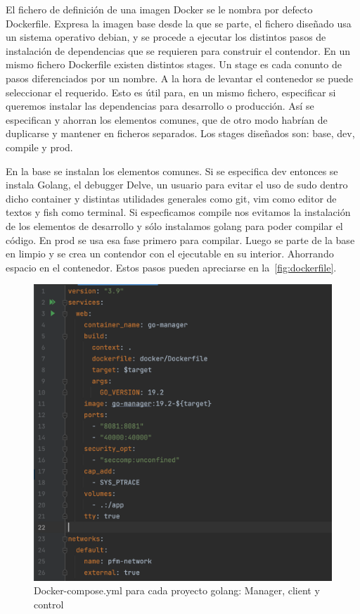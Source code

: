 
El fichero de definición de una imagen Docker se le nombra por defecto Dockerfile. Expresa la imagen base desde la que se parte, el fichero diseñado usa un sistema operativo debian, y se procede a ejecutar los distintos pasos de instalación de dependencias que se requieren para construir el contendor. En un mismo fichero Dockerfile existen distintos stages. Un stage es cada conunto de pasos diferenciados por un nombre. A la hora de levantar el contenedor se puede seleccionar el requerido. Esto es útil para, en un mismo fichero, especificar si queremos instalar las dependencias para desarrollo o producción. Así se especifican y ahorran los elementos comunes, que de otro modo habrían de duplicarse y mantener en ficheros separados. Los stages diseñados son: base, dev, compile y prod.

En la base se instalan los elementos comunes. Si se especifica dev entonces se instala Golang, el debugger Delve, un usuario para evitar el uso de sudo dentro dicho container y distintas utilidades generales como git, vim como editor de textos y fish como terminal. Si especficamos compile nos evitamos la instalación de los elementos de desarrollo y sólo instalamos golang para poder compilar el código. En prod se usa esa fase primero para compilar. Luego se parte de la base en limpio y se crea un contendor con el ejecutable en su interior. Ahorrando espacio en el contenedor. Estos pasos pueden apreciarse en la~\cref{fig:dockerfile}.

\begin{figure}[H]
    \centering
    \includegraphics[scale = 0.6]{part/Proyecto_ejecutivo/memoria_constructiva/docker/docker-compose}
    \caption{Docker-compose.yml para cada proyecto golang: Manager, client y control}\label{fig:dockercompose}
\end{figure}

